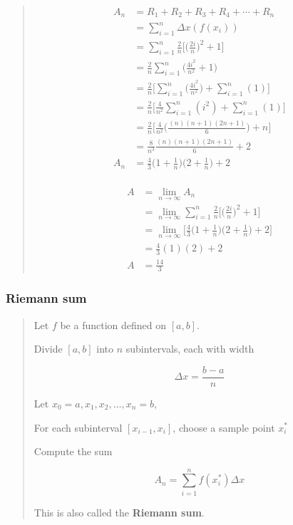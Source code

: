 \documentclass[
]{article}
\begin{document}
\begin{quote}
\begin{align*}
A_n &= R_1 + R_2 + R_3 + R_4 + \cdots + R_n\\
&= \sum_{i=1}^n \Delta x (f(x_i))\\
&= \sum_{i=1}^n \frac{2}{n} \Big[\Big(\frac{2i}{n}\Big)^2 +1\Big]\\
&= \frac{2}{n} \sum_{i=1}^n \Big(\frac{4i^2}{n^2} +1\Big)\\
&= \frac{2}{n} \Big[\sum_{i=1}^n \Big(\frac{4i^2}{n^2}\Big) + \sum_{i=1}^n(1)\Big]\\
&= \frac{2}{n} \Big[\frac{4}{n^2}\sum_{i=1}^n (i^2) + \sum_{i=1}^n(1)\Big]\\
&= \frac{2}{n} \Big[\frac{4}{n^2} \Big(\frac{(n)(n+1)(2n+1)}{6}\Big)+n\Big]\\
&= \frac{8}{n^3} \frac{(n)(n+1)(2n+1)}{6} +2\\
A_n &= \frac{4}{3}\Big(1+\frac{1}{n}\Big)\Big(2+\frac{1}{n}\Big) +2
\end{align*}\\

\begin{align*}
A &= \lim_{n \to\infty} A_n\\
&= \lim_{n \to \infty}  \sum_{i=1}^n \frac{2}{n} \Big[\Big(\frac{2i}{n}\Big)^2 +1\Big]\\
&= \lim_{n \to \infty} \Big[ \frac{4}{3}\Big(1+\frac{1}{n}\Big)\Big(2+\frac{1}{n}\Big) +2\Big]\\
&= \frac{4}{3}(1)(2)+ 2\\
A &= \frac{14}{3}
\end{align*}
\end{quote}

\hypertarget{riemann-sum}{%
\subsubsection{Riemann sum}\label{riemann-sum}}

\begin{quote}
Let \(f\) be a function defined on \([a,b]\).

Divide \([a,b]\) into \(n\) subintervals, each with width

\[ \Delta x = \frac{b-a}{n} \]

Let \(x_0=a, x_1,x_2, \ldots, x_n = b\),

For each subinterval \([x_{i-1},x_i]\), choose a sample point \(x_i^*\)

Compute the sum

\[A_n = \sum_{i=1}^{n}f(x_i^*)\Delta x \]

This is also called the \textbf{Riemann sum}.
\end{quote}
\end{document}
